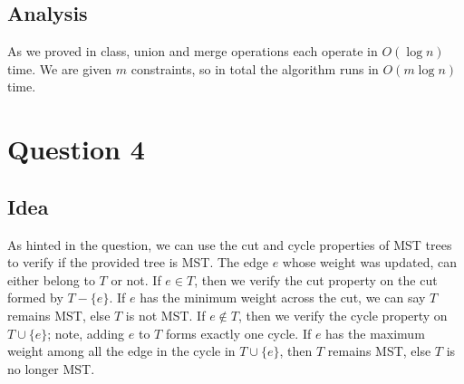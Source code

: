 \documentclass{article}
\begin{document}
    \subsection*{Analysis}
    As we proved in class, union and merge operations each operate in $O(\log n)$ time. We are given $m$ constraints, so in total the algorithm runs in $O(m \log n)$ time.

    \section*{Question 4}

    \subsection*{Idea}
    As hinted in the question, we can use the cut and cycle properties of MST trees to verify if the provided tree is MST. The edge $e$ whose weight was updated, can either belong to $T$ or not. If $e \in T$, then we verify the cut property on the cut formed by $T-\{e\}$. If $e$ has the minimum weight across the cut, we can say $T$ remains MST, else $T$ is not MST. If $e \notin T$, then we verify the cycle property on $T \cup \{e\}$; note, adding $e$ to $T$ forms exactly one cycle. If $e$ has the maximum weight among all the edge in the cycle in $T \cup \{e\}$, then $T$ remains MST, else $T$ is no longer MST.
    
\end{document}
